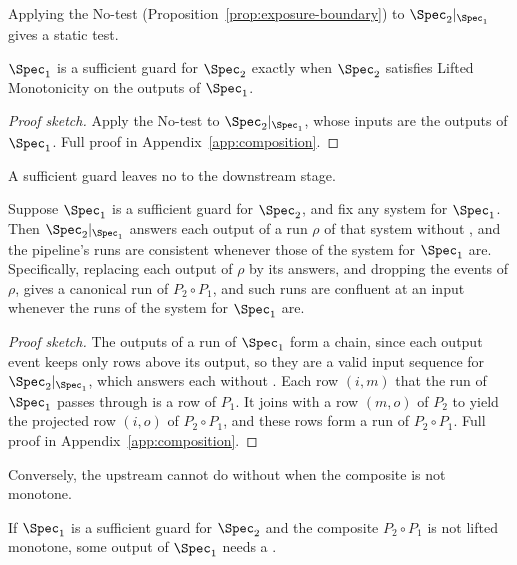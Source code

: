 Applying the No-\commitment test (Proposition~\ref{prop:exposure-boundary})
to $\Spec_2|_{\Spec_1}$ gives a static test.

\begin{proposition}
\label{prop:guard-test}
$\Spec_1$ is a sufficient guard for $\Spec_2$ exactly when
$\Spec_2$ satisfies Lifted Monotonicity on the outputs of $\Spec_1$.
\end{proposition}

\begin{proof}[Proof sketch]
Apply the No-\commitment test to $\Spec_2|_{\Spec_1}$, whose inputs are the
outputs of $\Spec_1$.  Full proof in Appendix~\ref{app:composition}.
\end{proof}

A sufficient guard leaves no \commitment to the downstream stage.

\begin{theorem}
\label{thm:sufficient-guards}
Suppose $\Spec_1$ is a sufficient guard for $\Spec_2$, and fix any
system for $\Spec_1$.  Then $\Spec_2|_{\Spec_1}$ answers each output of a run
$\rho$ of that system without \commitment, and the pipeline's runs are
consistent whenever those of the system for $\Spec_1$ are.  Specifically,
replacing each output of $\rho$ by its answers, and dropping the \commitment
events of $\rho$, gives a canonical run of $P_2\circ P_1$, and such runs are
confluent at an input whenever the runs of the system for $\Spec_1$ are.
\end{theorem}

\begin{proof}[Proof sketch]
The outputs of a run of $\Spec_1$ form a chain, since each output event keeps
only rows above its output, so they are a valid input sequence for
$\Spec_2|_{\Spec_1}$, which answers each without \commitment.  Each row
$(i,m)$ that the run of $\Spec_1$ passes through is a row of $P_1$.  It joins
with a row $(m,o)$ of $P_2$ to yield the projected row $(i,o)$ of
$P_2\circ P_1$, and these rows form a run of $P_2\circ P_1$.  Full proof in
Appendix~\ref{app:composition}.
\end{proof}

Conversely, the upstream cannot do without \commitments when the composite is
not monotone.

\begin{corollary}
\label{cor:upstream-commitments}
If $\Spec_1$ is a sufficient guard for $\Spec_2$ and the composite
$P_2\circ P_1$ is not lifted monotone, some output of $\Spec_1$ needs a
\commitment.
\end{corollary}

